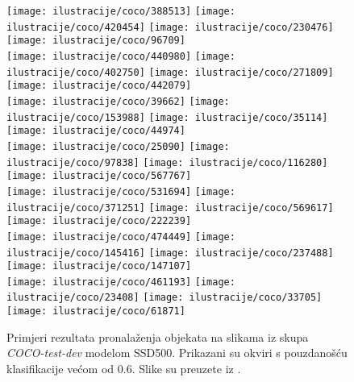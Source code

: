 \documentclass[utf8, diplomski, numeric, lmodern]{fer}
\begin{document}
\begin{figure}
	\centering
	\texttt{[image: ilustracije/coco/388513]}
	\texttt{[image: ilustracije/coco/420454]}
	\texttt{[image: ilustracije/coco/230476]}
	\texttt{[image: ilustracije/coco/96709]}\\
	\texttt{[image: ilustracije/coco/440980]}
	\texttt{[image: ilustracije/coco/402750]}
	\texttt{[image: ilustracije/coco/271809]}
	\texttt{[image: ilustracije/coco/442079]}\\
	\texttt{[image: ilustracije/coco/39662]}
	\texttt{[image: ilustracije/coco/153988]}
	\texttt{[image: ilustracije/coco/35114]}
	\texttt{[image: ilustracije/coco/44974]}\\
	\texttt{[image: ilustracije/coco/25090]}
	\texttt{[image: ilustracije/coco/97838]}
	\texttt{[image: ilustracije/coco/116280]}
	\texttt{[image: ilustracije/coco/567767]}\\
	\texttt{[image: ilustracije/coco/531694]}
	\texttt{[image: ilustracije/coco/371251]}
	\texttt{[image: ilustracije/coco/569617]}
	\texttt{[image: ilustracije/coco/222239]}\\
	\texttt{[image: ilustracije/coco/474449]}
	\texttt{[image: ilustracije/coco/145416]}
	\texttt{[image: ilustracije/coco/237488]}
	\texttt{[image: ilustracije/coco/147107]}\\
	\texttt{[image: ilustracije/coco/461193]}
	\texttt{[image: ilustracije/coco/23408]}
	\texttt{[image: ilustracije/coco/33705]}
	\texttt{[image: ilustracije/coco/61871]}\\
	\caption{Primjeri rezultata pronalaženja objekata na slikama iz skupa \emph{COCO-test-dev} modelom SSD500. Prikazani su okviri s pouzdanošću klasifikacije većom od $0.6$. Slike su preuzete iz \cite{ssd}.}
	\label{fig:primjeri-rezultata-detekcije}
\end{figure}
\end{document}
